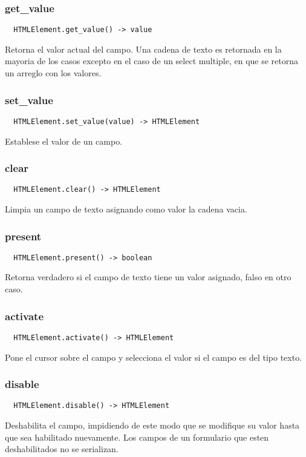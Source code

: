 \subsubsection*{get\_value}
\begin{verbatim}
  HTMLElement.get_value() -> value
\end{verbatim}
Retorna el valor actual del campo. Una cadena de texto es retornada en la
mayoria de los casos excepto en el caso de un select multiple, en que se retorna
un arreglo con los valores.

\subsubsection*{set\_value}
\begin{verbatim}
  HTMLElement.set_value(value) -> HTMLElement
\end{verbatim}
Establese el valor de un campo.

\subsubsection*{clear}
\begin{verbatim}
  HTMLElement.clear() -> HTMLElement
\end{verbatim}
Limpia un campo de texto asignando como valor la cadena vacia.

\subsubsection*{present}
\begin{verbatim}
  HTMLElement.present() -> boolean
\end{verbatim}
Retorna verdadero si el campo de texto tiene un valor asignado, falso en otro
caso.

\subsubsection*{activate}
\begin{verbatim}
  HTMLElement.activate() -> HTMLElement
\end{verbatim}
Pone el cursor sobre el campo y selecciona el valor si el campo es del tipo
texto.

\subsubsection*{disable}
\begin{verbatim}
  HTMLElement.disable() -> HTMLElement
\end{verbatim}
Deshabilita el campo, impidiendo de este modo que se modifique su valor hasta
que sea habilitado nuevamente.
Los campos de un formulario que esten deshabilitados no se serializan.

